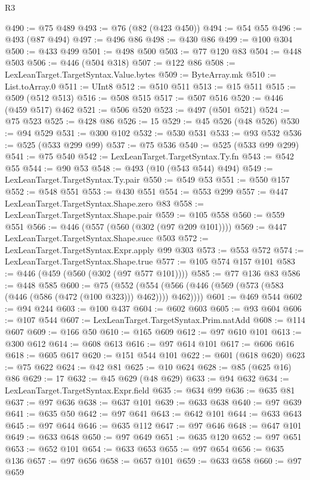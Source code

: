 \begin{lexlean}{R3}
\begin{coremodule}
@490 := @75 @489
@493 := @76 (@82 (@423 @450))
@494 := @54 @55
@496 := @493 (@87 @494)
@497 := @496 @86
@498 := @430 @86
@499 := @100 @304
@500 := @433 @499
@501 := @498 @500
@503 := @77 @120 @83
@504 := @448 @503
@506 := @446 (@504 @318)
@507 := @122 @86
@508 := LexLeanTarget.TargetSyntax.Value.bytes
@509 := ByteArray.mk
@510 := List.toArray.{0}
@511 := UInt8
@512 := @510 @511
@513 := @15 @511
@515 := @509 (@512 @513)
@516 := @508 @515
@517 := @507 @516
@520 := @446 (@459 @517) @462
@521 := @506 @520
@523 := @497 (@501 @521)
@524 := @75 @523
@525 := @428 @86
@526 := 15
@529 := @45 @526 (@48 @526)
@530 := @94 @529
@531 := @300 @102
@532 := @530 @531
@533 := @93 @532
@536 := @525 (@533 @299 @99)
@537 := @75 @536
@540 := @525 (@533 @99 @299)
@541 := @75 @540
@542 := LexLeanTarget.TargetSyntax.Ty.fn
@543 := @542 @55
@544 := @90 @53
@548 := @493 (@10 (@543 @544) @494)
@549 := LexLeanTarget.TargetSyntax.Ty.pair
@550 := @549 @53
@551 := @550 @157
@552 := @548 @551
@553 := @430 @551
@554 := @553 @299
@557 := @447 LexLeanTarget.TargetSyntax.Shape.zero @83
@558 := LexLeanTarget.TargetSyntax.Shape.pair
@559 := @105 @558
@560 := @559 @551
@566 := @446 (@557 (@560 (@302 (@97 @209 @101))))
@569 := @447 LexLeanTarget.TargetSyntax.Shape.succ @503
@572 := LexLeanTarget.TargetSyntax.Expr.apply @99 @303
@573 := @553 @572
@574 := LexLeanTarget.TargetSyntax.Shape.true
@577 := @105 @574 @157 @101
@583 := @446 (@459 (@560 (@302 (@97 @577 @101))))
@585 := @77 @136 @83
@586 := @448 @585
@600 := @75
    (@552 (@554 (@566 (@446 (@569 (@573 (@583 (@446 (@586 (@472 (@100 @323))) @462)))) @462))))
@601 := @469 @544
@602 := @94 @244
@603 := @100 @437
@604 := @602 @603
@605 := @93 @604
@606 := @107 @544
@607 := LexLeanTarget.TargetSyntax.Prim.natAdd
@608 := @114 @607
@609 := @166 @50
@610 := @165 @609
@612 := @97 @610 @101
@613 := @300 @612
@614 := @608 @613
@616 := @97 @614 @101
@617 := @606 @616
@618 := @605 @617
@620 := @151 @544 @101
@622 := @601 (@618 @620)
@623 := @75 @622
@624 := @42 @81
@625 := @10 @624
@628 := @85 (@625 @16) @86
@629 := 17
@632 := @45 @629 (@48 @629)
@633 := @94 @632
@634 := LexLeanTarget.TargetSyntax.Expr.field
@635 := @634 @99
@636 := @635 @81
@637 := @97 @636
@638 := @637 @101
@639 := @633 @638
@640 := @97 @639
@641 := @635 @50
@642 := @97 @641
@643 := @642 @101
@644 := @633 @643
@645 := @97 @644
@646 := @635 @112
@647 := @97 @646
@648 := @647 @101
@649 := @633 @648
@650 := @97 @649
@651 := @635 @120
@652 := @97 @651
@653 := @652 @101
@654 := @633 @653
@655 := @97 @654
@656 := @635 @136
@657 := @97 @656
@658 := @657 @101
@659 := @633 @658
@660 := @97 @659

\end{coremodule}
\end{lexlean}
